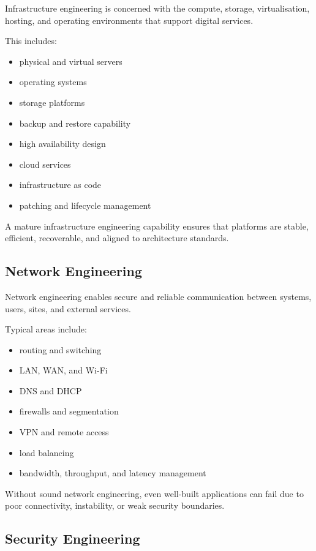 \documentclass[
  british,
  letterpaper,
  DIV=11,
  numbers=noendperiod]{scrartcl}
\providecommand{\tightlist}{%
  \setlength{\itemsep}{0pt}\setlength{\parskip}{0pt}}
\begin{document}
Infrastructure engineering is concerned with the compute, storage,
virtualisation, hosting, and operating environments that support digital
services.

This includes:

\begin{itemize}
\tightlist
\item
  physical and virtual servers
\item
  operating systems
\item
  storage platforms
\item
  backup and restore capability
\item
  high availability design
\item
  cloud services
\item
  infrastructure as code
\item
  patching and lifecycle management
\end{itemize}

A mature infrastructure engineering capability ensures that platforms
are stable, efficient, recoverable, and aligned to architecture
standards.

\subsection{Network Engineering}\label{network-engineering}

Network engineering enables secure and reliable communication between
systems, users, sites, and external services.

Typical areas include:

\begin{itemize}
\tightlist
\item
  routing and switching
\item
  LAN, WAN, and Wi-Fi
\item
  DNS and DHCP
\item
  firewalls and segmentation
\item
  VPN and remote access
\item
  load balancing
\item
  bandwidth, throughput, and latency management
\end{itemize}

Without sound network engineering, even well-built applications can fail
due to poor connectivity, instability, or weak security boundaries.

\subsection{Security Engineering}\label{security-engineering}
\end{document}
